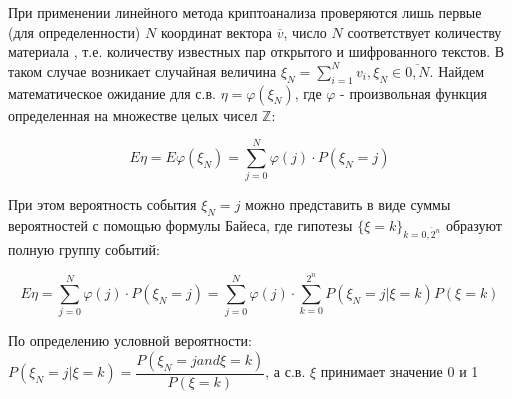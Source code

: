 \documentclass[utf8x, 14pt]{G7-32} %
\begin{document}
При применении линейного метода криптоанализа проверяются лишь первые (для определенности) $N$ координат вектора $\overline{v}$, число $N$ соответствует количеству материала , т.е. количеству известных пар открытого и шифрованного текстов. В таком случае возникает случайная величина $\xi_N = \sum_{i = 1}^{N} v_i, \xi_N \in \overline{0, N}$. Найдем математическое ожидание для с.в. $\eta = \varphi(\xi_N)$, где $\varphi$ - произвольная функция определенная на множестве целых чисел $\mathbb{Z}$:

$$ E \eta = E \varphi(\xi_N) = \sum_{j=0}^N \varphi(j)\cdot P(\xi_N = j) $$

При этом вероятность события $\xi_N = j$ можно представить в виде суммы вероятностей с помощью формулы Байеса, где гипотезы $\{\xi = k\}_{k = \overline{0, 2^n}}$ образуют полную группу событий:

$$ E\eta = \sum_{j=0}^N \varphi(j)\cdot P(\xi_N = j) = \sum_{j=0}^N \varphi(j)\cdot \sum_{k = 0}^{2^n} P(\xi_N = j | \xi = k) P(\xi = k)$$

По определению условной вероятности: $ P(\xi_N = j | \xi = k) = \dfrac{P(\xi_N = j and \xi = k)}{P(\xi = k)}$, а с.в. $\xi$ принимает значение 0 и 1 



\end{document}
